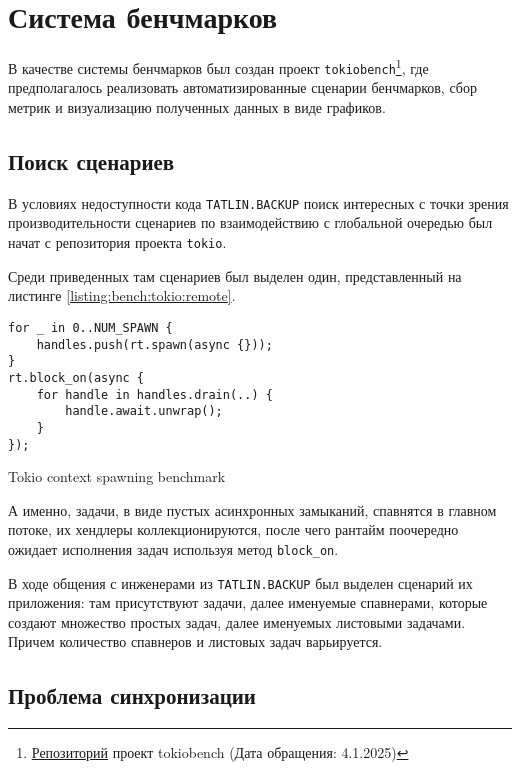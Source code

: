 
\section{Система бенчмарков}

В качестве системы бенчмарков был создан проект \verb|tokiobench|\footnote{\href{https://github.com/IgorErin/tokiobench}{Репозиторий} проект tokiobench (Дата обращения: 4.1.2025)}, где предполагалось реализовать автоматизированные сценарии бенчмарков, сбор метрик и визуализацию полученных данных в виде графиков.

\subsection{Поиск сценариев}

В условиях недоступности кода \verb|TATLIN.BACKUP| поиск интересных с точки зрения производительности сценариев по взаимодействию с глобальной очередью был начат с репозитория проекта \verb|tokio|.

Среди приведенных там сценариев был выделен один, представленный на листинге \ref{listing:bench:tokio:remote}.

\begin{listing}[H]
    \begin{verbatim}
for _ in 0..NUM_SPAWN {
    handles.push(rt.spawn(async {}));
}
rt.block_on(async {
    for handle in handles.drain(..) {
        handle.await.unwrap();
    }
});
    \end{verbatim}

    \caption{Tokio context spawning benchmark}
    \label{listing:bench:tokio:remote}
\end{listing}

А именно, задачи, в виде пустых асинхронных замыканий, спавнятся в главном потоке, их хендлеры коллекционируются, после чего рантайм поочередно ожидает исполнения задач используя метод \verb|block_on|.

В ходе общения с инженерами из \verb|TATLIN.BACKUP| был выделен сценарий их приложения: там присутствуют задачи, далее именуемые спавнерами, которые создают множество простых задач, далее именуемых листовыми задачами. Причем количество спавнеров и листовых задач варьируется.

\subsection{Проблема синхронизации}

